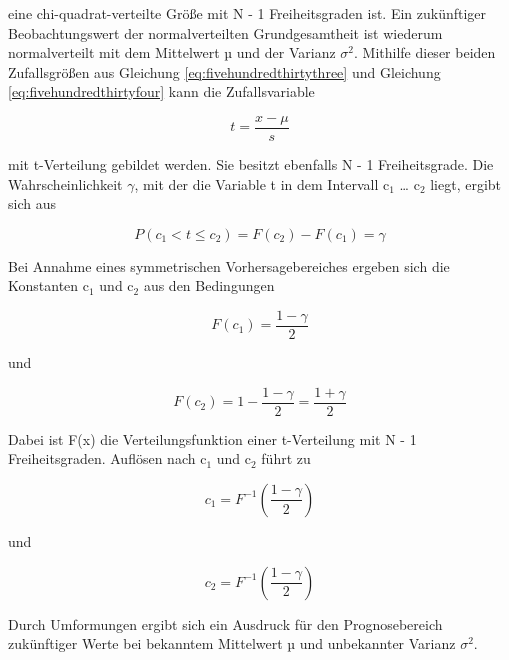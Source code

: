 \noindent eine chi-quadrat-verteilte Gr\"{o}{\ss}e mit N - 1 Freiheitsgraden ist. Ein zuk\"{u}nftiger Beobachtungswert der normalverteilten Grundgesamtheit ist wiederum normalverteilt mit dem Mittelwert µ und der Varianz $\sigma^{2}$. Mithilfe dieser beiden Zufallsgr\"{o}{\ss}en aus Gleichung \eqref{eq:fivehundredthirtythree} und Gleichung \eqref{eq:fivehundredthirtyfour} kann die Zufallsvariable

\begin{equation}\label{eq:fivehundredthirtyfive}
t=\dfrac{x-\mu}{s}
\end{equation}

\noindent mit t-Verteilung gebildet werden. Sie besitzt ebenfalls N - 1 Freiheitsgrade. Die Wahrscheinlichkeit $\gamma$, mit der die Variable t in dem Intervall c${}_{1}$ {\dots} c${}_{2}$ liegt, ergibt sich aus

\begin{equation}\label{eq:fivehundredthirtysix}
P\left(c_{1} <t\le c_{2} \right)=F(c_{2})-F(c_{1})=\gamma
\end{equation}

\noindent Bei Annahme eines symmetrischen Vorhersagebereiches ergeben sich die Konstanten c${}_{1}$ und c${}_{2}$ aus den Bedingungen

\begin{equation}\label{eq:fivehundredthirtyseven}
F(c_{1})=\dfrac{1-\gamma}{2}
\end{equation}

\noindent und 

\begin{equation}\label{eq:fivehundredthirtyeight}
F\left(c_{2} \right)=1-\dfrac{1-\gamma }{2} =\dfrac{1+\gamma}{2}
\end{equation}

\noindent Dabei ist F(x) die Verteilungsfunktion einer t-Verteilung mit N - 1 Freiheitsgraden. Aufl\"{o}sen nach c${}_{1}$ und c${}_{2}$ f\"{u}hrt zu

\begin{equation}\label{eq:fivehundredthirtynine}
c_{1} =F^{-1} \left(\dfrac{1-\gamma }{2} \right)
\end{equation}

\noindent und

\begin{equation}\label{eq:fivehundredfourty}
c_{2} =F^{-1} \left(\dfrac{1-\gamma }{2} \right)
\end{equation}

\noindent Durch Umformungen ergibt sich ein Ausdruck f\"{u}r den Prognosebereich zuk\"{u}nftiger Werte bei bekanntem Mittelwert µ und unbekannter Varianz $\sigma^{2}$.

